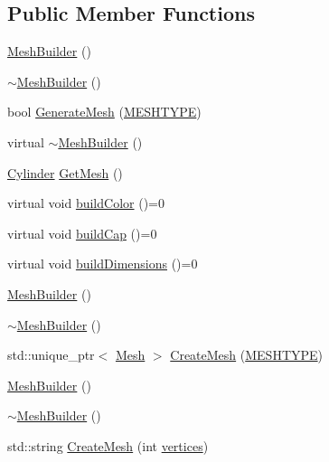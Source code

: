 \subsection*{Public Member Functions}
\begin{DoxyCompactItemize}
\item 
\mbox{\hyperlink{class_mesh_builder_a13fe22fd14a85f789dc9d7d4a8d2419d}{Mesh\+Builder}} ()
\item 
\mbox{\hyperlink{class_mesh_builder_ac409c889085089b34c5297cf7150f49d}{$\sim$\+Mesh\+Builder}} ()
\item 
bool \mbox{\hyperlink{class_mesh_builder_a9c48199d6ecab1f9c102e48d1b474f5a}{Generate\+Mesh}} (\mbox{\hyperlink{_abstract_factory_2_abstract_factory_2builder_2_mesh_builder_8h_ad6436347ddb93aed826a19081b53dd61}{M\+E\+S\+H\+T\+Y\+PE}})
\item 
virtual \mbox{\hyperlink{class_mesh_builder_a0ca7377cf981c1c2996f2f6dbc588352}{$\sim$\+Mesh\+Builder}} ()
\item 
\mbox{\hyperlink{class_cylinder}{Cylinder}} \mbox{\hyperlink{class_mesh_builder_a2db99e42ca33437243c6875a85417ef0}{Get\+Mesh}} ()
\item 
virtual void \mbox{\hyperlink{class_mesh_builder_a205a6daf8b50d88eebe1df434b7bf0c4}{build\+Color}} ()=0
\item 
virtual void \mbox{\hyperlink{class_mesh_builder_a5c69dabcf61fa1e87aa8b20fe2f54fe7}{build\+Cap}} ()=0
\item 
virtual void \mbox{\hyperlink{class_mesh_builder_af715a8510c99c7925bd8e6f0b6b182d7}{build\+Dimensions}} ()=0
\item 
\mbox{\hyperlink{class_mesh_builder_a13fe22fd14a85f789dc9d7d4a8d2419d}{Mesh\+Builder}} ()
\item 
\mbox{\hyperlink{class_mesh_builder_ac409c889085089b34c5297cf7150f49d}{$\sim$\+Mesh\+Builder}} ()
\item 
std\+::unique\+\_\+ptr$<$ \mbox{\hyperlink{class_mesh}{Mesh}} $>$ \mbox{\hyperlink{class_mesh_builder_a51d89fe601df06e63112c70416ac03dc}{Create\+Mesh}} (\mbox{\hyperlink{_abstract_factory_2_abstract_factory_2builder_2_mesh_builder_8h_ad6436347ddb93aed826a19081b53dd61}{M\+E\+S\+H\+T\+Y\+PE}})
\item 
\mbox{\hyperlink{class_mesh_builder_a13fe22fd14a85f789dc9d7d4a8d2419d}{Mesh\+Builder}} ()
\item 
\mbox{\hyperlink{class_mesh_builder_ac409c889085089b34c5297cf7150f49d}{$\sim$\+Mesh\+Builder}} ()
\item 
std\+::string \mbox{\hyperlink{class_mesh_builder_a33b55c406864ac41830dce591fb84ab0}{Create\+Mesh}} (int \mbox{\hyperlink{class_mesh_a922390e7245b484961cf4f6e9e37c9dd}{vertices}})
\end{DoxyCompactItemize}
